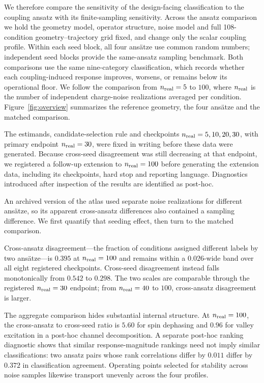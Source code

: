 \documentclass[aip,jap,reprint,superscriptaddress,longbibliography,floatfix]{revtex4-2}
\begin{document}
We therefore compare the sensitivity of the design-facing classification to
the coupling ansatz with its finite-sampling sensitivity. Across the ansatz
comparison we hold the geometry model, operator structure, noise model and full
108-condition geometry--trajectory grid fixed, and change only the scalar
coupling profile. Within each seed block, all four ans\"atze use common random
numbers; independent seed blocks provide the same-ansatz sampling benchmark.
Both comparisons use the same nine-category classification, which records
whether each coupling-induced response improves, worsens, or remains below its
operational floor. We follow the comparison from $n_{\rm real}=5$ to $100$,
where $n_{\rm real}$ is the number of independent charge-noise realizations
averaged per condition. Figure~\ref{fig:overview} summarizes the reference
geometry, the four ans\"atze and the matched comparison.

The estimands, candidate-selection rule and checkpoints
$n_{\rm real}=5,10,20,30$, with primary endpoint $n_{\rm real}=30$, were fixed
in writing before these data were generated. Because cross-seed disagreement
was still decreasing at that endpoint, we registered a follow-up extension to
$n_{\rm real}=100$ before generating the extension data, including its
checkpoints, hard stop and reporting language. Diagnostics introduced after
inspection of the results are identified as post-hoc.

An archived version of the atlas used separate noise realizations for different
ans\"atze, so its apparent cross-ansatz differences also contained a sampling
difference. We first quantify that seeding effect, then turn to the matched
comparison.

Cross-ansatz disagreement---the fraction of conditions assigned different
labels by two ans\"atze---is $0.395$ at $n_{\rm real}=100$ and remains within a
$0.026$-wide band over all eight registered checkpoints. Cross-seed disagreement
instead falls monotonically from $0.542$ to $0.298$. The two scales are
comparable through the registered $n_{\rm real}=30$ endpoint; from
$n_{\rm real}=40$ to $100$, cross-ansatz disagreement is larger.

The aggregate comparison hides substantial internal structure. At
$n_{\rm real}=100$, the cross-ansatz to cross-seed ratio is $5.60$ for spin
dephasing and $0.96$ for valley excitation in a post-hoc channel decomposition.
A separate post-hoc ranking diagnostic shows that similar response-magnitude
rankings need not imply similar classifications: two ansatz pairs whose rank
correlations differ by $0.011$ differ by $0.372$ in
classification agreement. Operating points selected for stability across noise
samples likewise transport unevenly across the four profiles.
\end{document}
